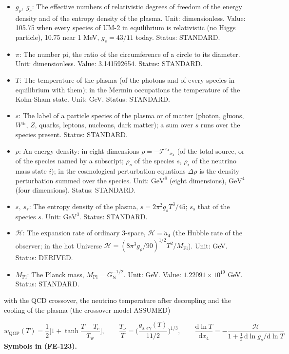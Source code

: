 \documentclass[
  10pt,
]{article}
\providecommand{\tightlist}{%
  \setlength{\itemsep}{0pt}\setlength{\parskip}{0pt}}
\begin{document}
\begin{itemize}
\tightlist
\item
  \(g_\rho,\ g_s\): The effective numbers of relativistic degrees of
  freedom of the energy density and of the entropy density of the
  plasma. Unit: dimensionless. Value: 105.75 when every species of UM-2
  in equilibrium is relativistic (no Higgs particle), 10.75 near 1 MeV,
  \(g_s = 43/11\) today. Status: STANDARD.
\item
  \(\pi\): The number pi, the ratio of the circumference of a circle to
  its diameter. Unit: dimensionless. Value: 3.141592654. Status:
  STANDARD.
\item
  \(T\): The temperature of the plasma (of the photons and of every
  species in equilibrium with them); in the Mermin occupations the
  temperature of the Kohn-Sham state. Unit: GeV. Status: STANDARD.
\item
  \(s\): The label of a particle species of the plasma or of matter
  (photon, gluons, \(W^\pm\), \(Z\), quarks, leptons, nucleons, dark
  matter); a sum over \(s\) runs over the species present. Status:
  STANDARD.
\item
  \(\rho\): An energy density: in eight dimensions
  \(\rho = -\mathcal{T}^{x_4}{}_{x_4}\) (of the total source, or of the
  species named by a subscript; \(\rho_s\) of the species \(s\),
  \(\rho_i\) of the neutrino mass state \(i\)); in the cosmological
  perturbation equations \(\Delta\rho\) is the density perturbation
  summed over the species. Unit: \(\mathrm{GeV}^{8}\) (eight
  dimensions), \(\mathrm{GeV}^{4}\) (four dimensions). Status: STANDARD.
\item
  \(s,\ s_s\): The entropy density of the plasma,
  \(s = 2\pi^2g_sT^3/45\); \(s_s\) that of the species \(s\). Unit:
  \(\mathrm{GeV}^{3}\). Status: STANDARD.
\item
  \(\mathcal{H}\): The expansion rate of ordinary 3-space,
  \(\mathcal{H} = \dot a_4\) (the Hubble rate of the observer; in the
  hot Universe
  \(\mathcal{H} = (8\pi^3g_\rho/90)^{1/2}T^2/M_{\mathrm{Pl}}\)). Unit:
  GeV. Status: DERIVED.
\item
  \(M_{\mathrm{Pl}}\): The Planck mass,
  \(M_{\mathrm{Pl}} = G_{\mathrm{N}}^{-1/2}\). Unit: GeV. Value:
  \(1.22091\times10^{19}\) GeV. Status: STANDARD.
\end{itemize}

with the QCD crossover, the neutrino temperature after decoupling and
the cooling of the plasma (the crossover model ASSUMED)

\[
w_{\mathrm{QGP}}(T) = \frac12\Big[1 + \tanh\frac{T - T_{\mathrm{c}}}{T_{\mathrm{w}}}\Big],\qquad
\frac{T_\nu}{T} = \Big(\frac{g_{s,e\gamma}(T)}{11/2}\Big)^{1/3},\qquad
\frac{\mathrm{d}\ln T}{\mathrm{d}x_4} = -\frac{\mathcal{H}}{1 + \frac13\,\mathrm{d}\ln g_s/\mathrm{d}\ln
 T} \tag{FE-123}
\] \textbf{Symbols in (FE-123).}
\end{document}
